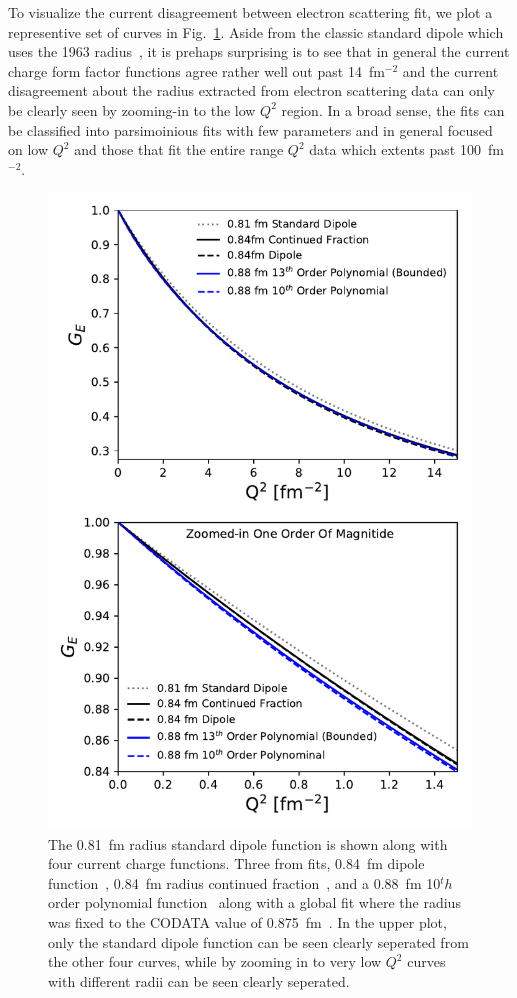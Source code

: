 \documentclass[10pt,aps,prc,twocolumn]{revtex4-1}
\begin{document}
To visualize the current disagreement between electron scattering fit, we plot a representive set of curves in Fig.~\ref{TwoOrders}.
Aside from the classic standard dipole which uses the 1963 radius~\cite{Hand:1963zz}, it is  prehaps surprising is to see that 
in general the current charge form factor functions agree rather well out past 14~fm$^{-2}$ and the current disagreement about the
radius extracted from electron scattering data can only be clearly seen by zooming-in to the low $Q^2$ region.
In a broad sense, the fits can be classified into parsimoinious fits with few parameters and in general focused on low $Q^2$ and
those that fit the entire range $Q^2$ data which extents past 100~fm$^{-2}$.

\begin{figure}
\includegraphics[width=\columnwidth]{Figure/TwoOrders.pdf}
\caption{The 0.81~fm radius standard dipole function is shown along with four current charge functions.
Three from fits, 0.84~fm dipole function~\cite{Higinbotham:2015rja}, 0.84~fm radius continued fraction~\cite{Griffioen:2015hta},
and a 0.88~fm 10$^th$ order polynomial function~\cite{Bernauer:2010wm} along with a global fit where the radius was fixed
to the CODATA value of 0.875~fm~\cite{Ye:2017gyb}.   In the upper plot, only the standard dipole function can be seen clearly
seperated from the other four curves, while by zooming in to very low $Q^2$ curves with different radii can be seen clearly
seperated.}
\label{TwoOrders}
\end{figure}
\end{document}
